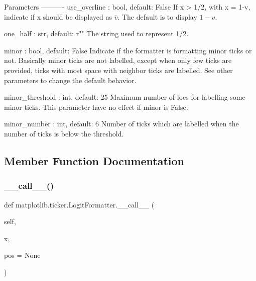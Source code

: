 \begin{DoxyVerb}Parameters
----------
use_overline : bool, default: False
    If x > 1/2, with x = 1-v, indicate if x should be displayed as
    $\overline{v}$. The default is to display $1-v$.

one_half : str, default: r""
    The string used to represent 1/2.

minor : bool, default: False
    Indicate if the formatter is formatting minor ticks or not.
    Basically minor ticks are not labelled, except when only few ticks
    are provided, ticks with most space with neighbor ticks are
    labelled. See other parameters to change the default behavior.

minor_threshold : int, default: 25
    Maximum number of locs for labelling some minor ticks. This
    parameter have no effect if minor is False.

minor_number : int, default: 6
    Number of ticks which are labelled when the number of ticks is
    below the threshold.
\end{DoxyVerb}
 

\subsection{Member Function Documentation}
\mbox{\label{classmatplotlib_1_1ticker_1_1LogitFormatter_ad7dcb2c5b656b3ec474f5ed19872c403}} 
\subsubsection{\texorpdfstring{\+\_\+\+\_\+call\+\_\+\+\_\+()}{\_\_call\_\_()}}
{\footnotesize\ttfamily def matplotlib.\+ticker.\+Logit\+Formatter.\+\_\+\+\_\+call\+\_\+\+\_\+ (\begin{DoxyParamCaption}\item[{}]{self,  }\item[{}]{x,  }\item[{}]{pos = {\ttfamily None} }\end{DoxyParamCaption})}

\mbox{\label{classmatplotlib_1_1ticker_1_1LogitFormatter_a99b6283e713459e69d328fb3b380e5f9}} 
